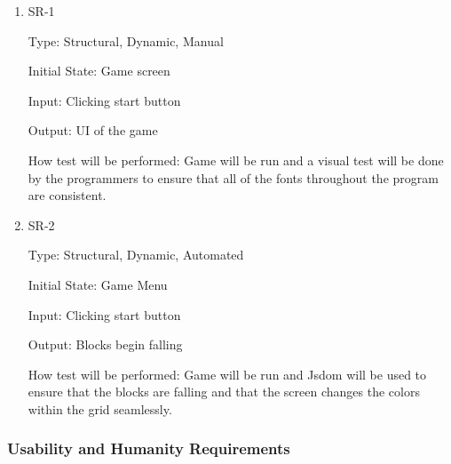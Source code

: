 \documentclass[12pt, titlepage]{article}
\begin{document}
\begin{enumerate}

\item{SR-1\\}

Type: Structural, Dynamic, Manual
					
Initial State: Game screen
					
Input: Clicking start button 
					
Output: UI of the game
					
How test will be performed: Game will be run and a visual test will be done by the programmers to ensure that all of the fonts throughout the program are consistent. 

\item{SR-2\\}

Type: Structural, Dynamic, Automated
					
Initial State: Game Menu 
					
Input: Clicking start button 
					
Output: Blocks begin falling
					
How test will be performed: Game will be run and Jsdom will be used to ensure that the blocks are falling and that the screen changes the colors within the grid seamlessly. 

\end{enumerate}

\subsubsection{Usability and Humanity Requirements}
\end{document}

